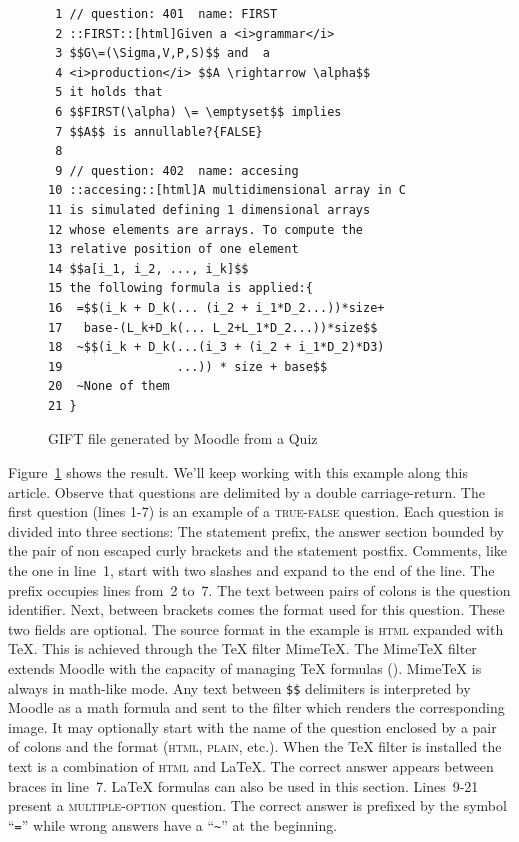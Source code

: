 \documentclass{pracjourn}[2006/02/20]
\begin{document}
\begin{figure}[htb]
\mbox{}\hrulefill
\vspace{-.6em}
\begin{footnotesize}
\begin{verbatim}
 1 // question: 401  name: FIRST 
 2 ::FIRST::[html]Given a <i>grammar</i> 
 3 $$G\=(\Sigma,V,P,S)$$ and  a
 4 <i>production</i> $$A \rightarrow \alpha$$ 
 5 it holds that 
 6 $$FIRST(\alpha) \= \emptyset$$ implies 
 7 $$A$$ is annullable?{FALSE}
 8 
 9 // question: 402  name: accesing 
10 ::accesing::[html]A multidimensional array in C 
11 is simulated defining 1 dimensional arrays 
12 whose elements are arrays. To compute the 
13 relative position of one element  
14 $$a[i_1, i_2, ..., i_k]$$   
15 the following formula is applied:{
16  =$$(i_k + D_k(... (i_2 + i_1*D_2...))*size+ 
17   base-(L_k+D_k(... L_2+L_1*D_2...))*size$$
18  ~$$(i_k + D_k(...(i_3 + (i_2 + i_1*D_2)*D3)
19                ...)) * size + base$$
20  ~None of them
21 } \end{verbatim}
\end{footnotesize}
\vspace{-1.5em}
\hrulefill
\caption{GIFT file generated by Moodle from a Quiz}
\label{fig:ficherogift}
\end{figure}

Figure~\ref{fig:ficherogift} shows the result. 
We'll keep working with this example along this article.
%
Observe that questions are delimited by a double carriage-return.
%
The first question (lines 1-7) is an example of a \textsc{true-false} question.
%
Each question is divided into three sections:
%
The statement prefix,
the answer section bounded by the pair of non escaped
curly brackets and the statement postfix. 
%
Comments, like the one in line~1, start with two slashes and expand to the end of the line.
%
The prefix occupies lines from~2 to~7.  The text between pairs
of colons is the question identifier. Next, between brackets
comes the format used for this question. These two fields
are optional.
The source format in the example 
is \textsc{html} expanded with \TeX{}.
This is achieved through the \TeX{}
filter MimeTeX. 
%
The MimeTeX filter extends Moodle with 
the capacity of managing \TeX{} formulas
(\cite{url:forkosh, url:leiser}).
MimeTeX is always in math-like mode. 
Any text between \verb|$$| delimiters is interpreted by Moodle as a math formula 
and sent to the filter which renders the corresponding image.
%
%
It may optionally start with the name of the question enclosed by a pair of colons and the 
format (\textsc{html}, \textsc{plain}, etc.). 
%
When the \TeX{} filter is installed the text is a combination of  \textsc{html}
and 
\LaTeX{}. 
%
The correct answer appears between braces in line~7. 
\LaTeX{} formulas can also be used in this section.
%
Lines~9-21 present a \textsc{multiple-option} question.
%
The correct answer is prefixed by the symbol  ``\verb|=|'' while wrong answers have 
a ``\verb|~|'' at the beginning. 
\end{document}
